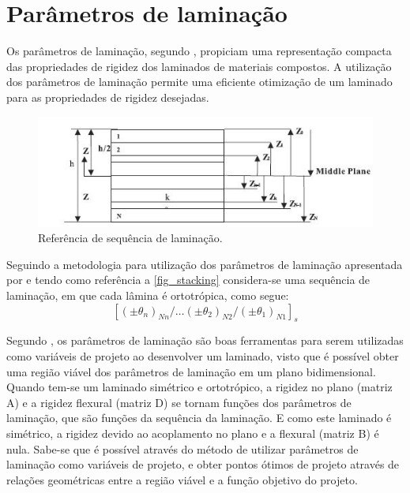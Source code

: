 \section{Parâmetros de laminação}
Os parâmetros de laminação, segundo \cite{tsai1968invariant}, propiciam uma representação compacta das propriedades de rigidez dos laminados de materiais compostos. A utilização dos parâmetros de laminação permite uma eficiente otimização de um laminado para as propriedades de rigidez desejadas.
\begin{figure}[h]
	\caption{\label{fig_stacking}Referência de sequência de laminação.}
  \centering
  \includegraphics[scale=1.0]{figura/Stacking}
\end{figure}

Seguindo a metodologia para utilização dos parâmetros de laminação apresentada por \cite{miki1991optimum} e tendo como referência a \autoref{fig_stacking} considera-se uma sequência de laminação, em que cada lâmina é ortotrópica, como segue:
\begin{equation} \label{stacking}
[(\pm\theta_n)_{Nn}/\dots(\pm\theta_2)_{N2}/(\pm\theta_1)_{N1}]_s
\end{equation}

Segundo \cite{miki1991optimum}, os parâmetros de laminação são boas ferramentas para serem utilizadas como variáveis de projeto ao desenvolver um laminado, visto que é possível obter uma região viável dos parâmetros de laminação em um plano bidimensional. Quando tem-se um laminado simétrico e ortotrópico, a rigidez no plano (matriz A) e a rigidez flexural (matriz D) se tornam funções dos parâmetros de laminação, que são funções da sequência da laminação. E como este laminado é simétrico, a rigidez devido ao acoplamento no plano e a flexural (matriz B) é nula. Sabe-se que é possível através do método de utilizar parâmetros de laminação como variáveis de projeto, e obter pontos ótimos de projeto através de relações geométricas entre a região viável e a função objetivo do projeto.

